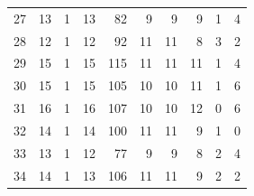 \begin{table}
\begin{tabular}{rrrrrrrrrr}
27 & 13 & 1 & 13 & 82 & 9 & 9 & 9 & 1 & 4 \\
28 & 12 & 1 & 12 & 92 & 11 & 11 & 8 & 3 & 2 \\
29 & 15 & 1 & 15 & 115 & 11 & 11 & 11 & 1 & 4 \\
30 & 15 & 1 & 15 & 105 & 10 & 10 & 11 & 1 & 6 \\
31 & 16 & 1 & 16 & 107 & 10 & 10 & 12 & 0 & 6 \\
32 & 14 & 1 & 14 & 100 & 11 & 11 & 9 & 1 & 0 \\
33 & 13 & 1 & 12 & 77 & 9 & 9 & 8 & 2 & 4 \\
34 & 14 & 1 & 13 & 106 & 11 & 11 & 9 & 2 & 2 \\
\bottomrule
\end{tabular}
\end{table}
